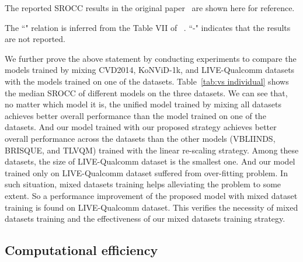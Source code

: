 \documentclass[twocolumn]{svjour3}          \smartqed  \usepackage{graphicx}
\begin{document}
\begin{table*}[!thb]
\begin{small}
    \vspace{1mm}
    
    The reported SROCC results in the original paper~\citep{korhonen2019two} are shown here for reference. 
    
    The ``" relation is inferred from the Table VII of ~\citet{korhonen2019two}. ``-" indicates that the results are not reported.
    \end{small}
\end{table*}

We further prove the above statement by conducting experiments to compare the models trained by mixing CVD2014, KoNViD-1k, and LIVE-Qualcomm datasets with the models trained on one of the datasets. 
Table~\ref{tab:vs individual} shows the median SROCC of different models on the three datasets.
We can see that, no matter which model it is, the unified model trained by mixing all datasets achieves better overall performance than the model trained on one of the datasets.
And our model trained with our proposed strategy achieves better overall performance across the datasets than the other models (VBLIINDS, BRISQUE, and TLVQM) trained with the linear re-scaling strategy. 
Among these datasets, the size of LIVE-Qualcomm dataset is the smallest one. And our model trained only on LIVE-Qualcomm dataset suffered from over-fitting problem. In such situation, mixed datasets training helps alleviating the problem to some extent. So a performance improvement of the proposed model with mixed dataset training is found on LIVE-Qualcomm dataset.
This verifies the necessity of mixed datasets training and the effectiveness of our mixed datasets training strategy.

\subsection{Computational efficiency}
\end{document}
